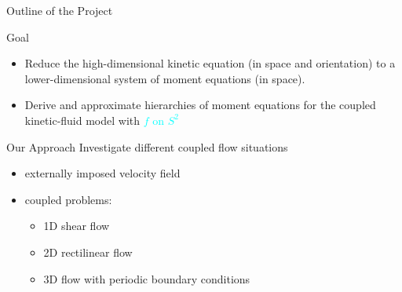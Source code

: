 \begin{frame}{Outline of the Project}
	\scriptsize
	\begin{block}{Goal}
		\begin{itemize}
			\item Reduce the high-dimensional kinetic equation (in space and orientation) to a lower-dimensional system of moment equations (in space).
			\item Derive and approximate hierarchies of moment equations for the coupled kinetic-fluid model with \textcolor{cyan}{$f$ on $S^2$}
		\end{itemize}
	\end{block}
    \pause
	\begin{block}{Our Approach}
		 Investigate different coupled flow situations
		\begin{itemize}
			\item externally imposed velocity field \checkmark
            \item coupled problems: 
            \begin{itemize}
            	\item 1D shear flow \checkmark
            	\item 2D rectilinear flow \checkmark
            	\item 3D flow with periodic boundary conditions
            \end{itemize}
		\end{itemize}
    \end{block}
\end{frame}



